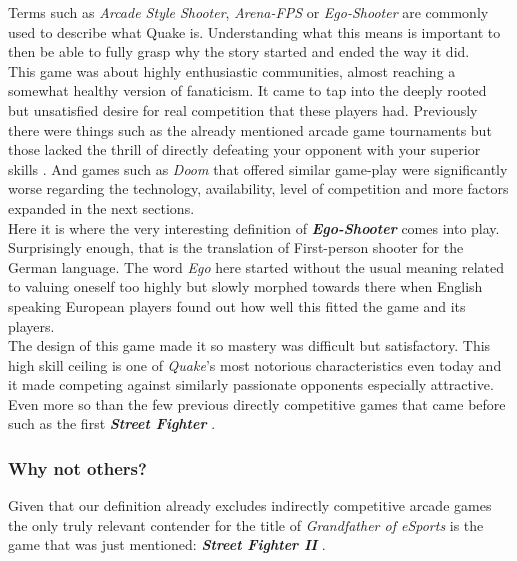 Terms such as \textit{Arcade Style Shooter}, \textit{Arena-FPS} or \textit{Ego-Shooter} are commonly used to describe what Quake is. Understanding what this means is important to then be able to fully grasp why the story started and ended the way it did.\\

This game was about highly enthusiastic communities, almost reaching a somewhat healthy version of fanaticism. It came to tap into the deeply rooted but unsatisfied desire for real competition that these players had. Previously there were things such as the already mentioned arcade game tournaments but those lacked the thrill of directly defeating your opponent with your superior skills \parencite[p.~7]{taylor2012raising}. And games such as \textit{Doom} \citep{game:doom} that offered similar game-play were significantly worse regarding the technology, availability, level of competition and more factors expanded in the next sections.\\

Here it is where the very interesting definition of \textbf{\textit{Ego-Shooter}} comes into play. Surprisingly enough, that is the translation of First-person shooter for the German language. The word \textit{Ego} here started without the usual meaning related to valuing oneself too highly but slowly morphed towards there when English speaking European players found out how well this fitted the game and its players.\\

The design of this game made it so mastery was difficult but satisfactory. This high skill ceiling is one of \textit{Quake}'s most notorious characteristics even today and it made competing against similarly passionate opponents especially attractive. Even more so than the few previous directly competitive games that came before such as the first \textit{\textbf{Street Fighter}} \citep{game:streetfighter2}.\\

\subsubsection{Why not others?}

Given that our definition already excludes indirectly competitive arcade games the only truly relevant contender for the title of \textit{Grandfather of eSports} is the game that was just mentioned: \textbf{\textit{Street Fighter II}} \citep{game:streetfighter2}.\\

